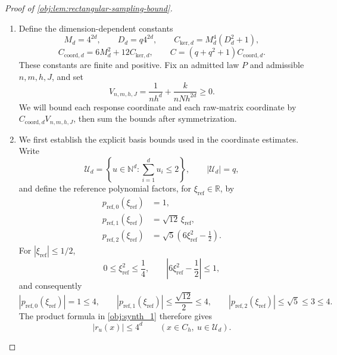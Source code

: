 \documentclass[11pt]{article}
\begin{document}
\begin{proof}[Proof of \cref{obj:lem:rectangular-sampling-bound}]
\begin{enumerate}
\item Define the dimension-dependent constants
\[
M_d=4^{2d},\qquad
D_d=q4^{2d},\qquad
C_{\mathrm{ker},d}=M_d^4(D_d^2+1),
\]
\[
C_{\mathrm{coord},d}=6M_d^2+12C_{\mathrm{ker},d},
\qquad
C=(q+q^2+1)C_{\mathrm{coord},d}.
\]
These constants are finite and positive. Fix an admitted law \(P\) and admissible \(n,m,h,J\), and set
\[
V_{n,m,h,J}
=\frac{1}{nh^d}+\frac{k}{nNh^{2d}}\ge0.
\]
We will bound each response coordinate and each raw-matrix coordinate by
\(C_{\mathrm{coord},d}V_{n,m,h,J}\), then sum the bounds after symmetrization.

\item We first establish the explicit basis bounds used in the coordinate estimates. Write
\[
\mathcal U_d
=\left\{u\in\mathbb N^d:\sum_{i=1}^d u_i\le2\right\},
\qquad |\mathcal U_d|=q,
\]
and define the reference polynomial factors, for \(\xi_{\mathrm{ref}}\in\mathbb R\), by
\[
\begin{aligned}
p_{\mathrm{ref},0}(\xi_{\mathrm{ref}})&=1,\\
p_{\mathrm{ref},1}(\xi_{\mathrm{ref}})&=\sqrt{12}\,\xi_{\mathrm{ref}},\\
p_{\mathrm{ref},2}(\xi_{\mathrm{ref}})
&=\sqrt5\left(6\xi_{\mathrm{ref}}^2-\frac12\right).
\end{aligned}
\]
For \(|\xi_{\mathrm{ref}}|\le1/2\),
\[
0\le\xi_{\mathrm{ref}}^2\le\frac14,
\qquad
\left|6\xi_{\mathrm{ref}}^2-\frac12\right|\le1,
\]
and consequently
\[
|p_{\mathrm{ref},0}(\xi_{\mathrm{ref}})|=1\le4,\qquad
|p_{\mathrm{ref},1}(\xi_{\mathrm{ref}})|
\le\frac{\sqrt{12}}2\le4,\qquad
|p_{\mathrm{ref},2}(\xi_{\mathrm{ref}})|\le\sqrt5\le3\le4.
\]
The product formula in \cref{obj:synth_1} therefore gives
\[
|r_u(x)|\le4^d
\qquad(x\in C_h,\ u\in\mathcal U_d).
\]


\end{enumerate}
\end{proof}
\end{document}
